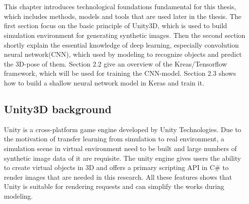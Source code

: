 \chapter{}
\label{sec:Technogical Fundations}
This chapter introduces technological foundations fundamental for this thesis, which includes methods, models and tools that are used later in the thesis. The first section focus on the basic principle of Unity3D, which is used to build simulation environment for generating synthetic images. Then the second section shortly explain the essential knowledge of deep learning, especially convolution neural network(CNN), which used by modeling to recognize objects and predict the 3D-pose of them. Section 2.2 give an overview of the Kreas/Tensorflow framework, which will be used for training the CNN-model. Section 2.3 shows how to build a shallow neural network model in Keras and train it.

\section{Unity3D background}
Unity is a cross-platform game engine developed by Unity Technologies. Due to the motivation of transfer learning from simulation to real environment, a simulation scene in virtual environment need to be built and large numbers of synthetic image data of it are requisite. The unity engine gives users the ability to create virtual objects in 3D and offers a primary scripting API in C\# to render images that are needed in this research. All these features shows that Unity is suitable for rendering requests and can simplify the works during modeling. 
